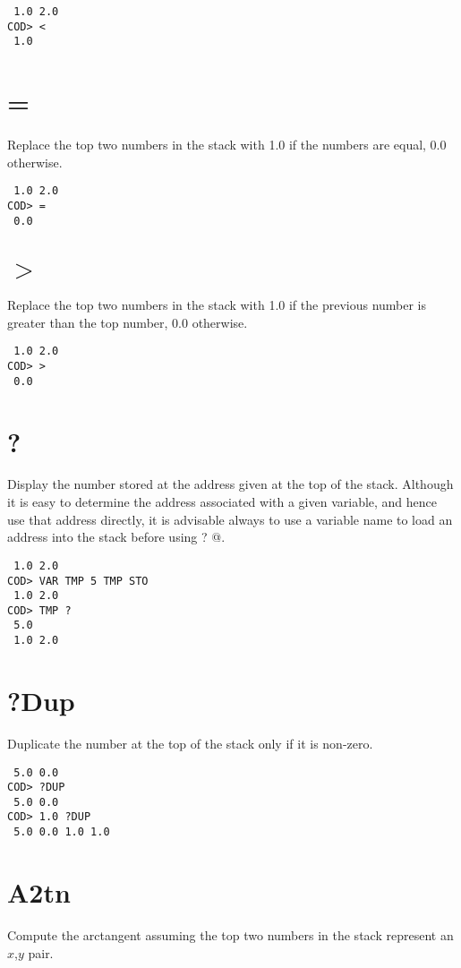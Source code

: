 \medskip
{}
\begin{verbatim}
 1.0 2.0
COD> <
 1.0
\end{verbatim}

\section*{=}
Replace the top two numbers in the stack with 1.0 if the numbers are equal,
0.0 otherwise.

\medskip
{}
\begin{verbatim}
 1.0 2.0
COD> =
 0.0
\end{verbatim}

\section*{$>$}
Replace the top two numbers in the stack with 1.0
if the previous number is greater than the top number,
0.0 otherwise.

\medskip
{}
\begin{verbatim}
 1.0 2.0
COD> >
 0.0
\end{verbatim}

\section*{?}
Display the number stored at the address given at the top of the stack.
Although it is easy to determine
the address associated with a given variable,
and hence use that address directly,
it is advisable always to use a variable name
to load an address into the stack before using \verb@ ? @.

\medskip
{}
\begin{verbatim}
 1.0 2.0
COD> VAR TMP 5 TMP STO
 1.0 2.0
COD> TMP ?
 5.0
 1.0 2.0
\end{verbatim}

\section*{?Dup}
Duplicate the number at the top of the stack only if it is non-zero.

\medskip
{}
\begin{verbatim}
 5.0 0.0
COD> ?DUP
 5.0 0.0
COD> 1.0 ?DUP
 5.0 0.0 1.0 1.0
\end{verbatim}

\section*{A2tn}
Compute the arctangent assuming the top two numbers in the stack
represent an $x$,$y$ pair.

